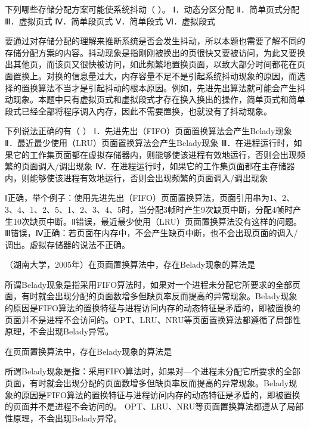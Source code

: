 \question 下列哪些存储分配方案可能使系统抖动（ ）。 Ⅰ．动态分区分配
Ⅱ．简单页式分配 Ⅲ．虚拟页式 Ⅳ．简单段页式 Ⅴ．简单段式 Ⅵ．虚拟段式
\par{}
\begin{solution}要通过对存储分配的理解来推断系统是否会发生抖动，所以本题也需要了解不同的存储分配方案的内容。抖动现象是指刚刚被换出的页很快又要被访问，为此又要换出其他页，而该页又很快被访问，如此频繁地置换页面，以致大部分时间都花在页面置换上。对换的信息量过大，内存容量不足不是引起系统抖动现象的原因，而选择的置换算法不当才是引起抖动的根本原因。例如，先进先出算法就可能会产生抖动现象。本题中只有虚拟页式和虚拟段式才存在换入换出的操作，简单页式和简单段式已经全部将程序调入内存，因此不需要置换，也就没有了抖动现象。
\end{solution}
\question 下列说法正确的有（ ） Ⅰ．先进先出（FIFO）页面置换算法会产生Belady现象
Ⅱ．最近最少使用（LRU）页面置换算法会产生Belady现象
Ⅲ．在进程运行时，如果它的工作集页面都在虚拟存储器内，则能够使该进程有效地运行，否则会出现频繁的页面调入/调出现象
Ⅳ．在进程运行时，如果它的工作集页面都在主存储器内，则能够使该进程有效地运行，否则会出现频繁的页面调入/调出现象
\par{}
\begin{solution}Ⅰ正确，举个例子：使用先进先出（FIFO）页面置换算法，页面引用串为1、2、3、4、1、2、5、1、2、3、4、5时，当分配3帧时产生9次缺页中断，分配4帧时产生10次缺页中断。Ⅱ错误，最近最少使用（LRU）页面置换算法没有这样的问题。Ⅲ错误，Ⅳ正确：若页面在内存中，不会产生缺页中断，也不会出现页面的调入/调出。虚拟存储器的说法不正确。
\end{solution}
\question （湖南大学，2005年）在页面置换算法中，存在Belady现象的算法是
\par{}
\begin{solution}所谓Belady现象是指采用FIFO算法时，如果对一个进程未分配它所要求的全部页面，有时就会出现分配的页面数增多但缺页率反而提高的异常现象。Belady现象的原因是FIFO算法的置换特征与进程访问内存的动态特征是矛盾的，即被置换的页面并不是进程不会访问的。OPT、LRU、NRU等页面置换算法都遵循了局部性原理，不会出现Belady异常。
\end{solution}
\question 在页面置换算法中，存在Belady现象的算法是
\par{}
\begin{solution}所谓Belady现象是指：采用FIFO算法时，如果对---个进程未分配它所要求的全部页面，有时就会出现分配的页面数增多但缺页率反而提高的异常现象。Belady现象的原因是FIFO算法的置换特征与进程访问内存的动态特征是矛盾的，即被置换的页面并不是进程不会访问的。
OPT、LRU、NRU等页面置换算法都遵从了局部性原理，不会出现Belady异常。
\end{solution}
